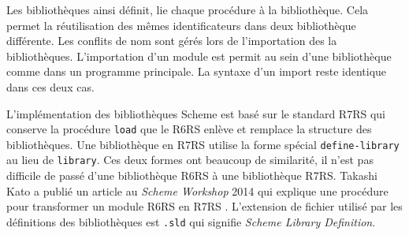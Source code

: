 Les bibliothèques ainsi définit, lie chaque procédure à la bibliothèque.  Cela
permet la réutilisation des mêmes identificateurs dans deux bibliothèque
différente.  Les conflits de nom sont gérés lors de l'importation des la
bibliothèques. L'importation d'un module est permit au sein d'une bibliothèque
comme dans un programme principale. La syntaxe d'un import reste identique dans
ces deux cas.


%

L'implémentation des bibliothèques Scheme est basé sur le standard R7RS qui
conserve la procédure \texttt{load} que le R6RS enlève et remplace la structure
des bibliothèques.  Une bibliothèque en R7RS utilise la forme spécial
\texttt{define-library} au lieu de \texttt{library}. Ces deux formes ont
beaucoup de similarité, il n'est pas difficile de passé d'une bibliothèque R6RS
à une bibliothèque R7RS. Takashi Kato a publié un article au \emph{Scheme
Workshop} 2014 qui explique une procédure pour transformer un module R6RS en
R7RS \cite{SW2014:R6RS/to/R7RS}.  L'extension de fichier utilisé par les
définitions des bibliothèques est \verb|.sld| qui signifie \emph{Scheme Library
Definition}.

